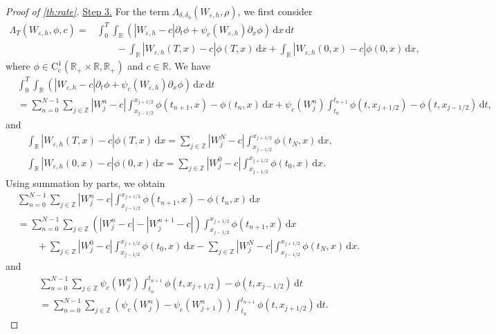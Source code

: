 \documentclass[10pt]{amsart}
\theoremstyle{plain}
\theoremstyle{definition}
\numberwithin{equation}{section}
\newcommand{\R}{\mathbb{R}}
\newcommand{\eps}{{\varepsilon}}
\newcommand{\dt}{{\, \mathrm{d}t}}
\newcommand{\dx}{{\, \mathrm{d}x}}
\begin{document}
\begin{proof}[Proof of \cref{th:rate}]
\uline{Step 3.} For the term $\Lambda_{\delta, \delta_0}(W_{\eps,h}, \rho)$, we first consider
\begin{align*}
    \Lambda_T(W_{\eps,h}, \phi, c)= & \int_0^T \int_{\mathbb{R}}\left(|W_{\eps,h}-c| \partial_t \phi+\psi_c(W_{\eps,h}) \partial_x \phi\right) \, \mathrm d x \, \mathrm d t \\
& \qquad -\int_{\mathbb{R}}|W_{\eps,h}(T,x)-c| \phi(T,x) \, \mathrm  d x+\int_{\mathbb{R}}|W_{\eps,h}(0,x)-c| \phi(0,x) \, \mathrm d x,
\end{align*}
where $\phi\in\mathrm{C}^1_{\mathrm{c}}(\mathbb{R}_+\times\mathbb{R},\mathbb{R}_+)$ and $c\in\R$.
We have
\begin{align*}
    &\int_0^T \int_{\mathbb{R}}\left(|W_{\eps,h}-c| \partial_t \phi+\psi_c(W_{\eps,h}) \partial_x \phi\right) \, \mathrm d x \, \mathrm d t \\
    &= \sum_{n=0}^{N-1}\sum_{j\in\mathbb{Z}} |W_j^n-c| \int_{x_{j-1/2}}^{x_{j+1/2}} \phi(t_{n+1},x)-\phi(t_n,x) \dx + \psi_c(W_j^n) \int_{t_n}^{t_{n+1}} \phi(t,x_{j+1/2})-\phi(t,x_{j-1/2})\dt,
\end{align*}
and
\begin{align*}
    \int_{\mathbb{R}}|W_{\eps,h}(T,x)-c| \phi(T,x) \, \mathrm  d x = \sum_{j\in\mathbb{Z}} |W_j^N-c| \int_{x_{j-1/2}}^{x_{j+1/2}} \phi(t_N,x) \dx, \\
    \int_{\mathbb{R}}|W_{\eps,h}(0,x)-c| \phi(0,x) \, \mathrm  d x = \sum_{j\in\mathbb{Z}} |W_j^0-c| \int_{x_{j-1/2}}^{x_{j+1/2}} \phi(t_0,x) \dx.
\end{align*}
Using summation by parts, we obtain
\begin{align*}
    &\sum_{n=0}^{N-1}\sum_{j\in\mathbb{Z}} |W_j^n-c| \int_{x_{j-1/2}}^{x_{j+1/2}} \phi(t_{n+1},x)-\phi(t_n,x) \dx  \\
    &= \sum_{n=0}^{N-1} \sum_{j\in\mathbb{Z}} \left( |W_j^n-c| - |W_j^{n+1}-c| \right) \int_{x_{j-1/2}}^{x_{j+1/2}} \phi(t_{n+1},x) \dx \\
    &\qquad + \sum_{j\in\mathbb{Z}} |W_j^0-c| \int_{x_{j-1/2}}^{x_{j+1/2}} \phi(t_0,x) \dx - \sum_{j\in\mathbb{Z}} |W_j^N-c| \int_{x_{j-1/2}}^{x_{j+1/2}} \phi(t_N,x) \dx.
\end{align*}
and
\begin{align*}
    &\sum_{n=0}^{N-1}\sum_{j\in\mathbb{Z}} \psi_c(W_j^n) \int_{t_n}^{t_{n+1}} \phi(t,x_{j+1/2})-\phi(t,x_{j-1/2})\dt \\
    &= \sum_{n=0}^{N-1}\sum_{j\in\mathbb{Z}} \left( \psi_c(W_j^n)-\psi_c(W_{j+1}^n) \right) \int_{t_n}^{t_{n+1}} \phi(t,x_{j+1/2}) \dt.

\end{align*}
\end{proof}
\end{document}
